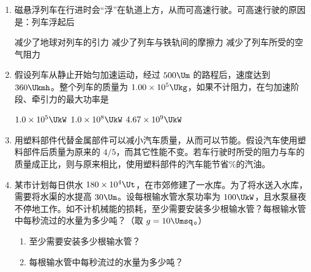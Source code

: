 \documentclass[\gkver]{gaokaozhenti}
\begin{document}
\begin{enumerate}
\item
磁悬浮列车在行进时会“浮”在轨道上方，从而可高速行驶。可高速行驶的原因是：列车浮起后

{减少了地球对列车的引力}
{减少了列车与铁轨间的摩擦力}
{减少了列车所受的空气阻力}


\item
假设列车从静止开始匀加速运动，经过 $500\Um$ 的路程后，速度达到 $360\Ukmh$。整个列车的质量为 $1.00\times10^{5}\Ukg$，如果不计阻力，在匀加速阶段、牵引力的最大功率是

{$1.0\times10^{5}\UkW$}
{$1.0\times10^{8}\UkW$}
{$4.67\times10^{9}\UkW$}


\item
用塑料部件代替金属部件可以减小汽车质量，从而可以节能。假设汽车使用塑料部件后质量为原来的 $4/5$，而其它性能不变。若车行驶时所受的阻力与车的质量成正比，则与原来相比，使用塑料部件的汽车能节省\%的汽油。


\item
某市计划每日供水 $180\times10^{4}\Ut$，在市郊修建了一水库。为了将水送入水库，需要将水渠的水提高 $30\Um$。设每根输水管水泵功率为 $100\UkW$，且水泵昼夜不停地工作。如不计机械能的损耗，至少需要安装多少根输水管？每根输水管中每秒流过的水量为多少吨？（取 $g=10\Umsq$。）

\begin{enumerate}
	\item
	至少需要安装多少根输水管？
	\item
	每根输水管中每秒流过的水量为多少吨？
\end{enumerate}


\end{enumerate}
\end{document}
